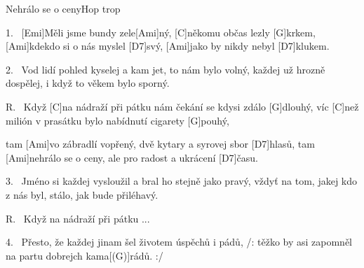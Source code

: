 \begin{song}{Nehrálo se o ceny}{Hop trop}

\begin{xverse}{1.~}
[Emi]Měli jsme bundy zele[Ami]ný, [C]někomu občas lezly [G]krkem,
[Ami]kdekdo si o nás myslel [D7]svý, [Ami]jako by nikdy nebyl [D7]klukem.
\end{xverse}

\begin{xverse}{2.~}
Vod lidí pohled kyselej a kam jet, to nám bylo volný,
každej už hrozně dospělej, i když to věkem bylo sporný.
\end{xverse}

\begin{xverse}{R.~}
Když [C]na nádraží při pátku nám čekání se kdysi zdálo [G]dlouhý,
víc [C]než milión v prasátku bylo nabídnutí cigarety [G]pouhý,
\end{xverse}

\begin{xverse}{}
tam [Ami]vo zábradlí vopřený, dvě kytary a syrovej sbor [D7]hlasů,
tam [Ami]nehrálo se o ceny, ale pro radost a ukrácení [D7]{ča}su.
\end{xverse}

\begin{xverse}{3.~}
Jméno si každej vysloužil a bral ho stejně jako pravý,
vždyť na tom, jakej kdo z nás byl, stálo, jak bude přiléhavý.
\end{xverse}

\begin{xverse}{R.~}
Když na nádraží při pátku ...
\end{xverse}

\begin{xverse}{4.~}
Přesto, že každej jinam šel životem úspěchů i pádů,
/: těžko by asi zapomněl na partu dobrejch kama[(G)]rádů. :/
\end{xverse}

\end{song}

